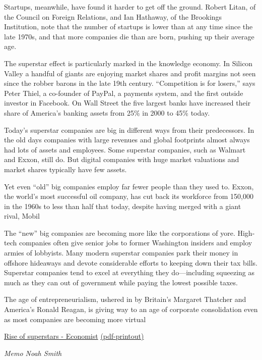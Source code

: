 \documentclass[
]{book}
\begin{document}
Startups, meanwhile, have found it harder to get off the ground. Robert Litan, of the Council on Foreign Relations, and Ian Hathaway, of the Brookings Institution, note that the number of startups is lower than at any time since the late 1970s, and that more companies die than are born, pushing up their average age.

The superstar effect is particularly marked in the knowledge economy. In Silicon Valley a handful of giants are enjoying market shares and profit margins not seen since the robber barons in the late 19th century. ``Competition is for losers,'' says Peter Thiel, a co-founder of PayPal, a payments system, and the first outside investor in Facebook. On Wall Street the five largest banks have increased their share of America's banking assets from 25\% in 2000 to 45\% today.

Today's superstar companies are big in different ways from their predecessors. In the old days companies with large revenues and global footprints almost always had lots of assets and employees. Some superstar companies, such as Walmart and Exxon, still do. But digital companies with huge market valuations and market shares typically have few assets.

Yet even ``old'' big companies employ far fewer people than they used to. Exxon, the world's most successful oil company, has cut back its workforce from 150,000 in the 1960s to less than half that today, despite having merged with a giant rival, Mobil

The ``new'' big companies are becoming more like the corporations of yore. High-tech companies often give senior jobs to former Washington insiders and employ armies of lobbyists. Many modern superstar companies park their money in offshore hideaways and devote considerable efforts to keeping down their tax bills. Superstar companies tend to excel at everything they do---including squeezing as much as they can out of government while paying the lowest possible taxes.

The age of entrepreneurialism, ushered in by Britain's Margaret Thatcher and America's Ronald Reagan, is giving way to an age of corporate consolidation even as most companies are becoming more virtual

\href{https://www.economist.com/special-report/2016/09/15/the-rise-of-the-superstars}{Rise of superstars - Economist}
\href{/pdf/Economist_2016_Superstars.pdf}{(pdf-printout)}

\emph{Memo Noah Smith}
\end{document}
